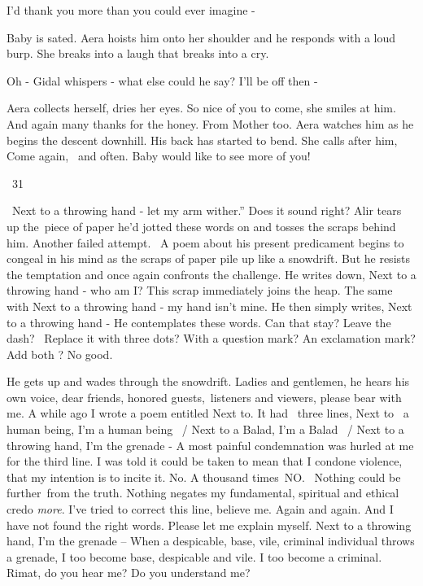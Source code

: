 \documentclass[letterpaper]{article}
\begin{document}
{\textquotedbl}I'd thank you more than you could ever imagine -{\textquotedbl} 

Baby is sated. Aera hoists him onto her shoulder and he responds with a loud burp. She breaks into a laugh that breaks
into a cry. 

{\textquotedbl}Oh -{\textquotedbl} Gidal whispers - what else could he say? {\textquotedbl}I'll be off then
-{\textquotedbl}

Aera collects herself, dries her eyes. {\textquotedbl}So nice of you to come,{\textquotedbl} she smiles at him.
{\textquotedbl}And again many thanks for the honey. From Mother too.{\textquotedbl} Aera watches him as he begins the
descent downhill. His back has started to bend. She calls after him, {\textquotedbl}Come again, \ and often. Baby would
like to see more of you!{\textquotedbl}


\bigskip

~31 

~{\textquotedbl}Next to a throwing hand - let my arm wither.'' Does it sound right? Alir tears up the~piece of paper
he'd jotted these words on\textcolor[rgb]{0.0,0.4392157,0.7529412}{ }and tosses the scraps behind him. Another failed
attempt. \ A poem about his present predicament begins to congeal in his mind as the scraps of paper pile up like a
snowdrift. But he resists the temptation and once again confronts the challenge. He writes down, {\textquotedbl}Next to
a throwing hand - who am I?{\textquotedbl} This scrap immediately joins the heap. The same with {\textquotedbl}Next to
a throwing hand - my hand isn't mine.{\textquotedbl} He then simply\textcolor[rgb]{0.0,0.4392157,0.7529412}{ }writes,
{\textquotedbl}Next to a throwing hand -{\textquotedbl} He contemplates these words. Can that stay? Leave the dash?
\ Replace it with three dots? With a question mark? An exclamation mark? Add both ? No good. 

He gets up and wades through the snowdrift. {\textquotedbl}Ladies and gentlemen,{\textquotedbl} he hears his own voice,
{\textquotedbl}dear friends, honored guests,~listeners and viewers, please bear with me. A while ago I wrote a poem
entitled {\textquotedbl}Next to{\textquotedbl}. It had~ three lines, {\textquotedbl}Next to ~a human being, I'm a human
being ~/ Next to a Balad, I'm a Balad ~/ Next to a throwing hand, I'm the grenade -{\textquotedbl} A most
painful\textcolor{red}{ }condemnation was hurled at me for the third line. I was told it could be taken to mean that I
condone violence, that my intention is to incite it. No. A thousand times~NO. \ Nothing could be further~from the
truth. Nothing negates my fundamental, spiritual and ethical credo \textit{more}. I've tried to correct this line,
believe me. Again and again. And I have not found the right words. Please let me explain myself. {\textquotedbl}Next to
a throwing hand, I'm the grenade --{\textquotedbl} When a despicable, base, vile, criminal individual throws a grenade,
I too become base, despicable\textcolor[rgb]{0.0,0.4392157,0.7529412}{ }and vile. I too become a criminal. Rimat, do
you hear me? Do you understand me?
\end{document}
